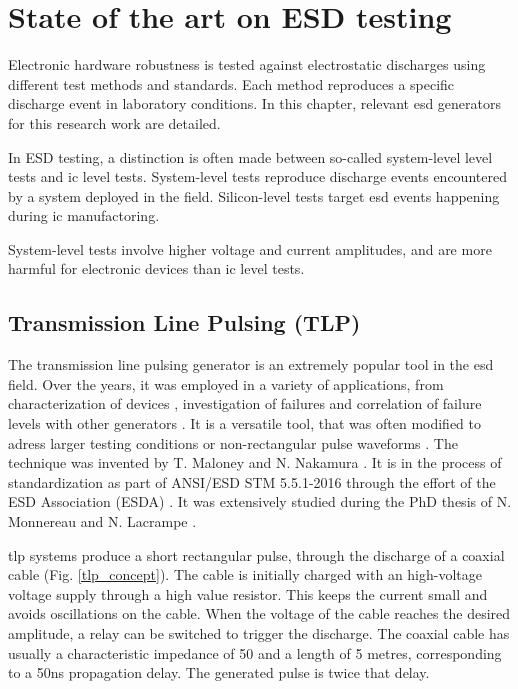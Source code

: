 \section{State of the art on ESD testing}
\label{sec:state-art-esd-testing}

Electronic hardware robustness is tested against electrostatic discharges using different test methods and standards.
Each method reproduces a specific discharge event in laboratory conditions.
In this chapter, relevant \gls{esd} generators for this research work are detailed.

In ESD testing, a distinction is often made between so-called system-level level tests and \gls{ic} level tests.
System-level tests reproduce discharge events encountered by a system deployed in the field.
Silicon-level tests target \gls{esd} events happening during \gls{ic} manufactoring.

System-level tests involve higher voltage and current amplitudes, and are more harmful for electronic devices than \gls{ic} level tests.

\subsection{Transmission Line Pulsing (TLP)}

The transmission line pulsing generator is an extremely popular tool in the \gls{esd} field.
Over the years, it was employed in a variety of applications, from characterization of devices \cite{TLPforESDProtectionCz, TLPthroubleshooting}, investigation of failures \cite{tlp-application-1, tlp-application-2} and correlation of failure levels with other generators \cite{correlation-system-level-esd-tlp}.
It is a versatile tool, that was often modified to adress larger testing conditions \cite{tlp-power} or non-rectangular pulse waveforms \cite{tlp-based-hmm, my-publi-tlp-hmm}.
The technique was invented by T. Maloney and N. Nakamura \cite{TLP}.
It is in the process of standardization as part of ANSI/ESD STM 5.5.1-2016 \cite{tlp-standard} through the effort of the ESD Association (ESDA) \cite{esda}.
It was extensively studied during the PhD thesis of N. Monnereau \cite{phd-monnereau} and N. Lacrampe \cite{phd-lacrampe}.

\gls{tlp} systems produce a short rectangular pulse, through the discharge of a coaxial cable (Fig. \ref{tlp_concept}).
The cable is initially charged with an high-voltage voltage supply through a high value resistor.
This keeps the current small and avoids oscillations on the cable.
When the voltage of the cable reaches the desired amplitude, a relay can be switched to trigger the discharge.
The coaxial cable has usually a characteristic impedance of 50\textOmega{} and a length of 5 metres, corresponding to a 50ns propagation delay.
The generated pulse is twice that delay.

